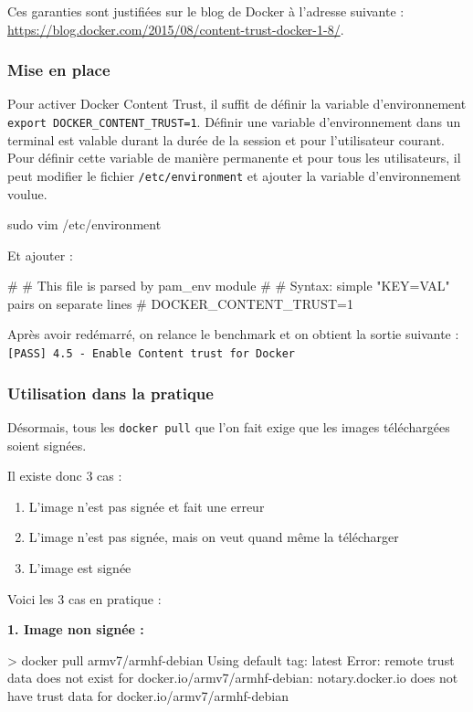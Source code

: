 \documentclass[11pt,a4paper,oneside]{report}
\newcommand{\code}[1]{\texttt{#1}}
\begin{document}
Ces garanties sont justifiées sur le blog de Docker à l'adresse suivante : \url{https://blog.docker.com/2015/08/content-trust-docker-1-8/}.

\subsubsection{Mise en place}
Pour activer Docker Content Trust, il suffit de définir la variable d'environnement \linebreak \code{export DOCKER\_CONTENT\_TRUST=1}. Définir une variable d'environnement dans un terminal est valable durant la durée de la session et pour l'utilisateur courant. Pour définir cette variable de manière permanente et pour tous les utilisateurs, il peut modifier le fichier \code{/etc/environment} et ajouter la variable d'environnement voulue.

\begin{bashcode}
sudo vim /etc/environment
\end{bashcode}

Et ajouter :
\begin{bashcode}
#
# This file is parsed by pam_env module
#
# Syntax: simple "KEY=VAL" pairs on separate lines
#
DOCKER_CONTENT_TRUST=1
\end{bashcode}

Après avoir redémarré, on relance le benchmark et on obtient la sortie suivante : \code{[PASS] 4.5  - Enable Content trust for Docker}

\subsubsection{Utilisation dans la pratique}
Désormais, tous les \code{docker pull} que l'on fait exige que les images téléchargées soient signées. 

Il existe donc 3 cas :
\begin{enumerate}
\item L'image n'est pas signée et fait une erreur
\item L'image n'est pas signée, mais on veut quand même la télécharger
\item L'image est signée
\end{enumerate}

Voici les 3 cas en pratique :

\textbf{1. Image non signée :}
\begin{textcode}
> docker pull armv7/armhf-debian
Using default tag: latest
Error: remote trust data does not exist for docker.io/armv7/armhf-debian: notary.docker.io does not have trust data for docker.io/armv7/armhf-debian
\end{textcode}
\end{document}
